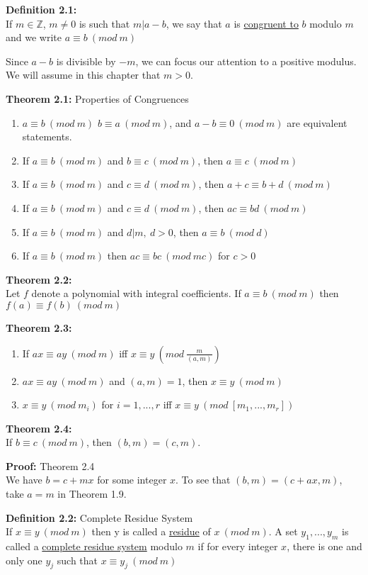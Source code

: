 \documentclass[a4paper]{article}
\begin{document}
\textbf{Definition 2.1:}\\
If $m\in\mathbb{Z}$, $m\neq0$ is such that $m|a-b$, we say that $a$ is \underline{congruent to} $b$ modulo $m$ and we write $a\equiv b\ (mod\ m)$

Since $a-b$ is divisible by $-m$, we can focus our attention to a positive modulus. We will assume in this chapter that $m>0$.

\textbf{Theorem 2.1:} Properties of Congruences
\begin{enumerate}
    \item $a\equiv b\ (mod\ m)$ $b\equiv a\ (mod\ m)$, and $a-b\equiv 0\ (mod\ m)$ are equivalent statements.
    \item If $a\equiv b\ (mod\ m)$ and $b\equiv c\ (mod\ m)$, then $a\equiv c\ (mod\ m)$
    \item If $a\equiv b\ (mod\ m)$ and $c\equiv d\ (mod\ m)$, then $a+c\equiv b+d\ (mod\ m)$
    \item If $a\equiv b\ (mod\ m)$ and $c\equiv d\ (mod\ m)$, then $ac\equiv bd\ (mod\ m)$
    \item If $a\equiv b\ (mod\ m)$ and $d|m,\ d>0$, then $a\equiv b\ (mod\ d)$
    \item If $a\equiv b\ (mod\ m)$ then $ac\equiv bc\ (mod\ mc)$ for $c>0$
\end{enumerate}

\textbf{Theorem 2.2:}\\
Let $f$ denote a polynomial with integral coefficients. If $a\equiv b\ (mod\ m)$ then $f(a)\equiv f(b)\ (mod\ m)$

\textbf{Theorem 2.3:}
\begin{enumerate}
    \item If $ax\equiv ay\ (mod\ m)$ iff $x\equiv y\ (mod\ \frac{m}{(a,m)})$
    \item $ax\equiv ay\ (mod\ m)$ and $(a,m)=1$, then $x\equiv y\ (mod\ m)$
    \item $x\equiv y\ (mod\ m_i)$ for $i=1,...,r$ iff $x\equiv y\ (mod\ [m_1,...,m_r])$
\end{enumerate}


\textbf{Theorem 2.4:}\\
If $b\equiv c\ (mod\ m)$, then $(b,m)=(c,m)$.

\textbf{Proof:} Theorem 2.4\\
We have $b=c+mx$ for some integer $x$. To see that $(b,m)=(c+ax,m)$, take $a=m$ in Theorem 1.9.

\textbf{Definition 2.2:} Complete Residue System\\
If $x\equiv y\ (mod\ m)$ then y is called a \underline{residue} of $x\ (mod\ m)$. A set $y_1,...,y_m$ is called a \underline{complete residue system} modulo $m$ if for every integer $x$, there is one and only one $y_j$ such that $x \equiv y_j\ (mod\ m)$
\end{document}
